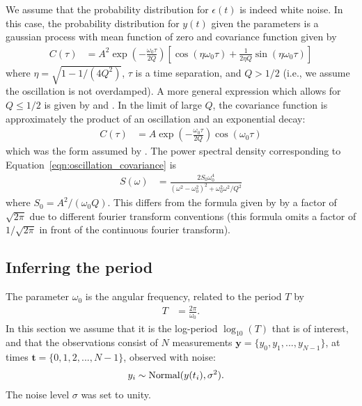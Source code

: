 \documentclass[a4paper, 12pt]{article}
\begin{document}
We assume that the probability distribution for $\epsilon(t)$ is indeed white
noise. In this case, the probability distribution for $y(t)$ given the
parameters is a gaussian process with mean function of zero and
covariance function given by
\begin{align}
C(\tau) &= A^2\exp\left(-\frac{\omega_0\tau}{2Q}\right)
            \left[\cos(\eta\omega_0\tau)
                + \frac{1}{2\eta Q}\sin(\eta\omega_0\tau)\right]
    \label{eqn:oscillation_covariance}
\end{align}
where $\eta = \sqrt{1 - 1/(4Q^2)}$, $\tau$ is a time separation,
and $Q > 1/2$ (i.e., we assume the oscillation is not overdamped).
A more general expression which allows for $Q \leq 1/2$
is given by \citet{anderson} and \citet{celerite}.
In the limit of large $Q$, the covariance function is approximately
the product of an oscillation and an exponential decay:
\begin{align}
C(\tau) &= A\exp\left(-\frac{\omega_0\tau}{2Q}\right)\cos(\omega_0\tau)
\end{align}
which was the form assumed by \citet{brewer_stello}.
The power spectral density corresponding to
Equation~\ref{eqn:oscillation_covariance} is
\begin{align}
S(\omega) &= \frac{2S_0\omega_0^4}
                  {(\omega^2 - \omega_0^2)^2 + \omega_0^2\omega^2/Q^2}
\end{align}
where $S_0 = A^2/(\omega_0Q)$. This differs from the formula given by
\citet{celerite} by a factor of $\sqrt{2\pi}$ due to different fourier
transform conventions (this formula omits a factor of $1/\sqrt{2\pi}$
in front of the continuous fourier transform).


\subsection{Inferring the period}
The parameter $\omega_0$ is the angular frequency, related to the period
$T$ by
\begin{align}
T &= \frac{2\pi}{\omega_0}.
\end{align}
In this section we assume that it is the log-period $\log_{10}(T)$ that is
of interest, and that the observations consist of $N$ measurements
$\boldsymbol{y} = \{y_0, y_1, ..., y_{N-1}\}$,
at times $\boldsymbol{t} = \{0,1,2,...,N-1\}$, observed with noise:
\begin{align}
y_i &\sim \textnormal{Normal}(y(t_i), \sigma^2).
\end{align}
The noise level $\sigma$ was set to unity.
\end{document}
